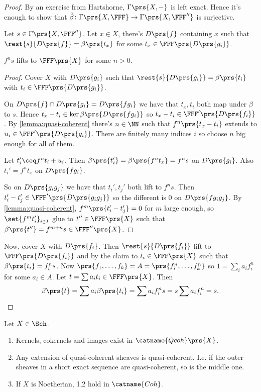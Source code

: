 \documentclass[10pt,a4paper,twoside,openany,hidelinks]{book}
\begin{document}
\begin{proof}
By an exercise from Hartshorne, $\Gamma\prs{X,-}$ is left exact.
Hence it's enough to show that $\tilde{\beta} \colon \Gamma\prs{X,\FFF} \to \Gamma\prs{X,\FFF''}$ is surjective.

Let $s \in \Gamma\prs{X,\FFF''}$.
Let $x \in X$, there's $D\prs{f}$ containing $x$ such that $\rest{s}{D\prs{f}} = \beta\prs{t_x}$ for some $t_x \in \FFF\prs{D\prs{g_i}}$.

\begin{claim}
$f^n s$ lifts to $\FFF\prs{X}$ for some $n > 0$.
\end{claim}

\begin{proof}
Cover $X$ with $D\prs{g_i}$ such that $\rest{s}{D\prs{g_i}} = \beta\prs{t_i}$ with $t_i \in \FFF\prs{D\prs{g_i}}$.

On $D\prs{f} \cap D\prs{g_i} = D\prs{f g_i}$ we have that $t_x, t_i$ both map under $\beta$ to $s$. Hence $t_x - t_i \in \ker \beta \prs{D \prs{f g_i}}$ so $t_x - t_i \in \FFF'\prs{D\prs{f _i}}$.
By \ref{lemma:quasi-coherent} there's $n \in \NN$ such that $f^n \prs{t_x - t_i}$ extends to $u_i \in \FFF'\prs{D\prs{g_i}}$. There are finitely many indices $i$ so choose $n$ big enough for all of them.

Let $t_i' \ceq f^n t_i + u_i$. Then $\beta\prs{t_i'} = \beta\prs{f^n t_x} = f^n s$ on $D\prs{g_i}$.
Also $t_i' = f^n t_x$ on $D\prs{f g_i}$.

So on $D\prs{g_i g_j}$ we have that $t_i', t_j'$ both lift to $f^n s$. Then $t_i' - t_j' \in \FFF'\prs{D\prs{g_i g_j}}$ so the different is $0$ on $D\prs{f g_i g_j}$.
By \ref{lemma:quasi-coherent}, $f^m \prs{t_i' - t_j'} = 0$ for $m$ large enough, so $\set{f^m t_i'}_{i \in I}$ glue to $t'' \in \FFF\prs{X}$ such that $\beta\prs{t''} = f^{m+n}s \in \FFF''\prs{X}$.
\end{proof}

Now, cover $X$ with $D\prs{f_i}$. Then $\rest{s}{D\prs{f_i}}$ lift  to $\FFF\prs{D\prs{f_i}}$ and by the claim to $t_i \in \FFF\prs{X}$ such that $\beta\prs{t_i} = f_i^n s$.
Now
$\prs{f_1, \ldots, f_k} = A = \prs{f_i^n, \ldots, f_k^n}$ so $1 = \sum_{i} a_i f_i^n$ for some $a_i \in A$. Let $t = \sum a_i t_i \in \FFF\prs{X}$.
Then
\[\beta\prs{t} = \sum a_i \beta\prs{t_i} = \sum a_i f_i^n s = s \sum a_i f_i^n = s \text{.}\]
\end{proof}

\begin{proposition}
Let $X \in \Sch$.
\begin{enumerate}
\item Kernels, cokernels and images exist in $\catname{Qcoh}\prs{X}$.
\item Any extension of quasi-coherent sheaves is quasi-coherent. I.e. if the outer sheaves in a short exact sequence are quasi-coherent, so is the middle one.
\item If $X$ is Noetherian, 1,2 hold in $\catname{Coh}$.
\end{enumerate}
\end{proposition}
\end{document}
